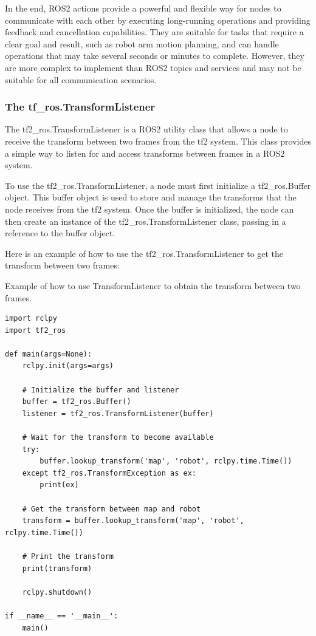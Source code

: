 \documentclass[12pt,oneside]{article}
\begin{document}
In the end, ROS2 actions provide a powerful and flexible way for nodes to communicate with each other by executing long-running operations and providing feedback and cancellation capabilities. They are suitable for tasks that require a clear goal and result, such as robot arm motion planning, and can handle operations that may take several seconds or minutes to complete. However, they are more complex to implement than ROS2 topics and services and may not be suitable for all communication scenarios.

\subsubsection{The tf\_ros.TransformListener}\label{ros2-transform-listener}
The tf2\_ros.TransformListener is a ROS2 utility class that allows a node to receive the transform between two frames from the tf2 system. This class provides a simple way to listen for and access transforms between frames in a ROS2 system.

To use the tf2\_ros.TransformListener, a node must first initialize a tf2\_ros.Buffer object. This buffer object is used to store and manage the transforms that the node receives from the tf2 system. Once the buffer is initialized, the node can then create an instance of the tf2\_ros.TransformListener class, passing in a reference to the buffer object.

Here is an example of how to use the tf2\_ros.TransformListener to get the transform between two frames:
\begin{listing}[H]
\caption{Example of how to use TransformListener to obtain the transform between two frames.}
\label{code:transformliseter}
\begin{verbatim}
import rclpy
import tf2_ros

def main(args=None):
    rclpy.init(args=args)

    # Initialize the buffer and listener
    buffer = tf2_ros.Buffer()
    listener = tf2_ros.TransformListener(buffer)

    # Wait for the transform to become available
    try:
        buffer.lookup_transform('map', 'robot', rclpy.time.Time())
    except tf2_ros.TransformException as ex:
        print(ex)

    # Get the transform between map and robot
    transform = buffer.lookup_transform('map', 'robot', rclpy.time.Time())

    # Print the transform
    print(transform)

    rclpy.shutdown()

if __name__ == '__main__':
    main()

\end{verbatim}
\end{listing} 
\end{document}
